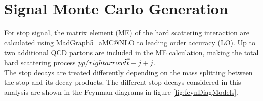 \section{Signal Monte Carlo Generation}
\label{sec:MC:Sig}

\indent For stop signal, the matrix element (ME) of the hard scattering interaction are calculated using {\sc MadGraph5\_aMC\/@NLO} to leading order accuracy (LO).\cite{Madgraph}  Up to two additional QCD partons are included in the ME calculation, making the total hard scattering process $pp /rightarrow {\tilde{t}}\bar{\tilde{t}} + j + j $.   \\

\indent The stop decays are treated differently depending on the mass splitting between the stop and its decay products.  The different stop decays considered in this analysis are shown in the Feynman diagrams in figure \ref{fig:feynDiagModels}. \\

